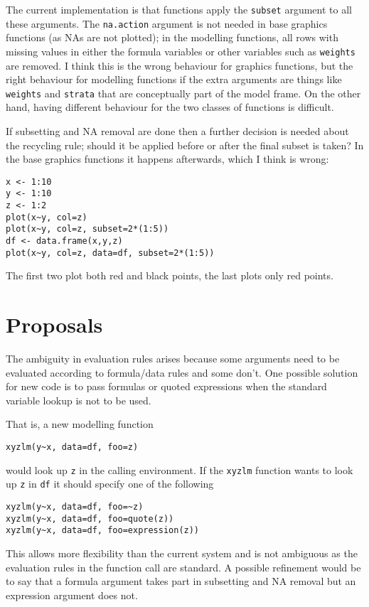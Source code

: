 \documentclass[11pt]{article}
\begin{document}
The current implementation is that functions apply the \texttt{subset} argument to all these arguments.  The \texttt{na.action} argument is not needed in base graphics functions (as NAs are not plotted); in the modelling functions, all rows with missing values in either the formula variables or other variables such as \texttt{weights} are removed.   I think this is the wrong behaviour for graphics functions, but the right behaviour for modelling functions if the extra arguments are things like \texttt{weights} and \texttt{strata} that are conceptually part of the model frame.  On the other hand, having different behaviour for the two classes of functions is difficult.

If subsetting and NA removal are done then a further decision is needed about the recycling rule; should it be applied before or after the final subset is taken?  In the base graphics functions it happens afterwards, which I think is wrong:
\begin{verbatim}
x <- 1:10
y <- 1:10
z <- 1:2
plot(x~y, col=z)                        
plot(x~y, col=z, subset=2*(1:5))  
df <- data.frame(x,y,z)
plot(x~y, col=z, data=df, subset=2*(1:5))
\end{verbatim}
The first two plot both red and black points, the last plots only red points.


\section{Proposals}
The ambiguity in evaluation rules arises because some arguments need to be evaluated according to formula/data rules and some don't.  One possible solution for new code is to pass formulas or quoted expressions when the standard variable lookup is not to be used.

That is, a new modelling function 
\begin{verbatim}
xyzlm(y~x, data=df, foo=z)
\end{verbatim}
would look up \verb=z= in the calling environment.  If the \texttt{xyzlm} function wants to look up  \verb=z= in \verb=df= it should specify one of the following
\begin{verbatim}
xyzlm(y~x, data=df, foo=~z)
xyzlm(y~x, data=df, foo=quote(z))
xyzlm(y~x, data=df, foo=expression(z))
\end{verbatim}
This allows more flexibility than the current system and is not ambiguous as the evaluation rules in the function call are standard.  A possible refinement would be to say that a formula argument takes part in subsetting and NA removal but an expression argument does not. 
\end{document}
